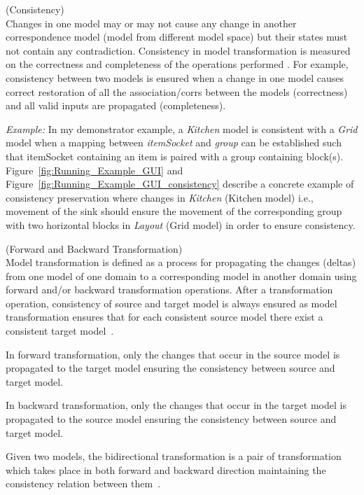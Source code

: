 \begin{defn}\label{defConsistency } (Consistency)\\
Changes in one model may or may not cause any change in another correspondence model (model from different model space) but their states must not contain any contradiction. Consistency in model transformation is measured on the correctness and completeness of the operations performed \cite{modelsynchro-tgg}. For example, consistency between two models is ensured when a change in one model causes correct  restoration of all the association/corrs between the models (correctness) and all valid inputs are propagated (completeness).
\end{defn} 

\textit{Example:} In my demonstrator example, a \textit{Kitchen} model is consistent with a \textit{Grid} model when a mapping between \textit{itemSocket} and \textit{group} can be established such that itemSocket containing an item is paired with a group containing block(s). 
Figure~\ref{fig:Running_Example_GUI} and Figure~\ref{fig:Running_Example_GUI_consistency} describe a concrete example of consistency preservation where changes in \textit{Kitchen} (Kitchen model) i.e., movement of the sink should ensure the movement of the corresponding group with two horizontal blocks in \textit{Layout} (Grid model) in order to ensure consistency.

\begin{defn}\label{deffwdbkdtrans} (Forward and Backward Transformation)\\
Model transformation is defined as a process for propagating the changes (deltas) from one model of one domain to a corresponding model in another domain using forward and/or backward transformation operations. After a transformation operation, consistency of source and target model is always ensured as model transformation ensures that for each consistent source model there exist a consistent target model~\cite{modelsynchro-tgg}.

In forward transformation, only the changes that occur in the source model is propagated to the target model ensuring the consistency between source and target model.

In backward transformation, only the changes that occur in the target model is propagated to the source model ensuring the consistency between source and target model.

Given two models, the bidirectional transformation is a pair of transformation which takes place in both forward and backward direction maintaining the consistency relation between them~\cite{understanding-bx}.
\end{defn}


